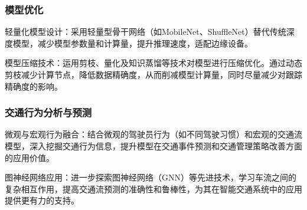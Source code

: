 \subsubsection{模型优化}
轻量化模型设计：采用轻量型骨干网络（如MobileNet、ShuffleNet）替代传统深度模型，减少模型参数量和计算量，提升推理速度，适配边缘设备。

模型压缩技术：运用剪枝、量化及知识蒸馏等技术对模型进行压缩优化。通过动态剪枝减少计算节点，降低数据精确度，从而削减模型计算量，同时尽量减少对跟踪精确度的影响。

\subsubsection{交通行为分析与预测}
微观与宏观行为融合：结合微观的驾驶员行为（如不同驾驶习惯）和宏观的交通流模型，深入挖掘交通行为信息，提升模型在交通事件预测和交通管理策略改善方面的应用价值。

图神经网络应用：进一步探索图神经网络（GNN）等先进技术，学习车流之间的复杂相互作用，提高交通流预测的准确性和鲁棒性，为其在智能交通系统中的应用提供更有力的支持。

